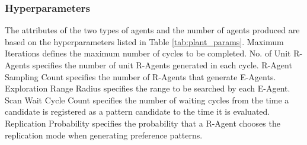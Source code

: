 \subsubsection{Hyperparameters}
The attributes of the two types of agents and the number of agents produced are based on the hyperparameters listed in Table \ref{tab:plant_params}. Maximum Iterations defines the maximum number of cycles to be completed. No. of Unit R-Agents specifies the number of unit R-Agents generated in each cycle. R-Agent Sampling Count specifies the number of R-Agents that generate E-Agents. Exploration Range Radius specifies the range to be searched by each E-Agent. Scan Wait Cycle Count specifies the number of waiting cycles from the time a candidate is registered as a pattern candidate to the time it is evaluated. Replication Probability specifies the probability that a R-Agent chooses the replication mode when generating preference patterns.

